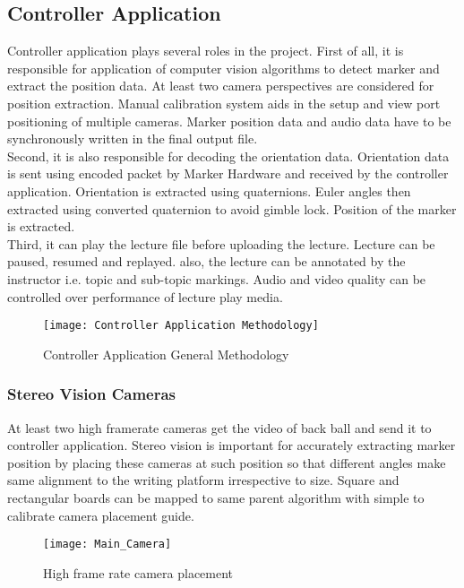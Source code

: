 \subsection{Controller Application}
Controller application plays several roles in the project. First of all, it is responsible for application of computer vision algorithms to detect marker and extract the position data. At least two camera perspectives are considered for position extraction. Manual calibration system aids in the setup and view port positioning of multiple cameras. Marker position data and audio data have to be synchronously written in the final output file.\\
Second, it is also responsible for decoding the orientation data. Orientation data is sent using encoded packet by Marker Hardware and received by the controller application. Orientation is extracted using quaternions. Euler angles then extracted using converted quaternion to avoid gimble lock. Position of the marker is extracted.\\
Third, it can play the lecture file before uploading the lecture. Lecture can be paused, resumed and replayed. also, the lecture can be annotated by the instructor i.e. topic and sub-topic markings. Audio and video quality can be controlled over performance of lecture play media.\\

\begin{figure}[h]
  \centering
  \texttt{[image: Controller Application Methodology]}
  \caption{Controller Application General Methodology}
\end{figure}


\subsubsection{Stereo Vision Cameras}
At least two high framerate cameras get the video of back ball and send it to controller application. Stereo vision is important for accurately extracting marker position by placing these cameras at such position so that different angles make same alignment to the writing platform irrespective to size. Square and rectangular boards can be mapped to same parent algorithm with simple to calibrate camera placement guide.

\bigskip

\begin{figure}[h]
  \centering
  \texttt{[image: Main\_Camera]}
  \caption{High frame rate camera placement}
\end{figure}


